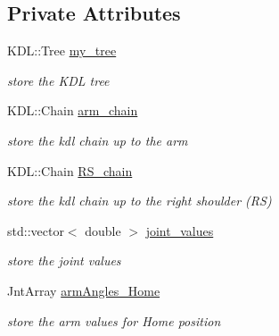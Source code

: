\subsection*{Private Attributes}
\begin{DoxyCompactItemize}
\item 
\mbox{\label{classKDL__IK_ab88c264c531d047146dd6042619ccc11}} 
K\+D\+L\+::\+Tree \hyperlink{classKDL__IK_ab88c264c531d047146dd6042619ccc11}{my\+\_\+tree}
\begin{DoxyCompactList}\small\item\em store the K\+DL tree \end{DoxyCompactList}\item 
\mbox{\label{classKDL__IK_a5bfdf9991aecb31a19c542ed3e00445c}} 
K\+D\+L\+::\+Chain \hyperlink{classKDL__IK_a5bfdf9991aecb31a19c542ed3e00445c}{arm\+\_\+chain}
\begin{DoxyCompactList}\small\item\em store the kdl chain up to the arm \end{DoxyCompactList}\item 
\mbox{\label{classKDL__IK_a108760856d54cff9d178c5cd7fed56dc}} 
K\+D\+L\+::\+Chain \hyperlink{classKDL__IK_a108760856d54cff9d178c5cd7fed56dc}{R\+S\+\_\+chain}
\begin{DoxyCompactList}\small\item\em store the kdl chain up to the right shoulder (RS) \end{DoxyCompactList}\item 
\mbox{\label{classKDL__IK_a0b1e97f5d23c79a40986acbf2d1d5472}} 
std\+::vector$<$ double $>$ \hyperlink{classKDL__IK_a0b1e97f5d23c79a40986acbf2d1d5472}{joint\+\_\+values}
\begin{DoxyCompactList}\small\item\em store the joint values \end{DoxyCompactList}\item 
\mbox{\label{classKDL__IK_ae5ce6ddb1594093232d33b3dc8b222ed}} 
Jnt\+Array \hyperlink{classKDL__IK_ae5ce6ddb1594093232d33b3dc8b222ed}{arm\+Angles\+\_\+\+Home}
\begin{DoxyCompactList}\small\item\em store the arm values for \textquotesingle{}Home\textquotesingle{} position \end{DoxyCompactList}\item 

\end{DoxyCompactItemize}
